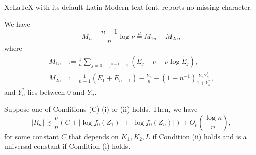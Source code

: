 \documentclass[10pt,a4paper]{amsart}
\begin{document}
XeLaTeX with its default Latin Modern text font, reports no missing character.
\begin{lemma}\label{lemma:dist_same}
	We have
	\begin{equation*}
		M_n - \frac{n-1}{n}\log \nu \stackrel{d}{=} M_{1n} + M_{2n},
	\end{equation*}
	where
	\begin{align*}
		M_{1n} &:= \frac{1}{n} \sum_{j=0,\ldots, \frac{n-1}{\nu}-1} \left( \tilde{E}_j - \nu - \nu \log \tilde{E}_j \right),\\
		M_{2n} &:= \frac{1}{n-1} (E_1+E_{n+1})- \frac{Y_n}{n} - (1-n^{-1})\frac{Y_n Y^*_n}{1+Y^*_n},
	\end{align*}
	and $Y^*_n$ lies between $0$ and $Y_n$.
\end{lemma}

\begin{lemma}\label{lemma:Rn_terms}
Suppose one of Conditions (C) (i) or (ii) holds.
Then, we have
\begin{equation*}
    |R_n| \precsim \frac{\nu}{n}(C + |\log f_0(Z_1)| + |\log f_0(Z_n)|) +O_p\left(\frac{\log n}{n}\right),
\end{equation*}
for some constant $C$ that depends on $K_1,K_2, L$ if Condition (ii) holds and is a universal constant if Condition (i) holds.
\end{lemma}
\end{document}
